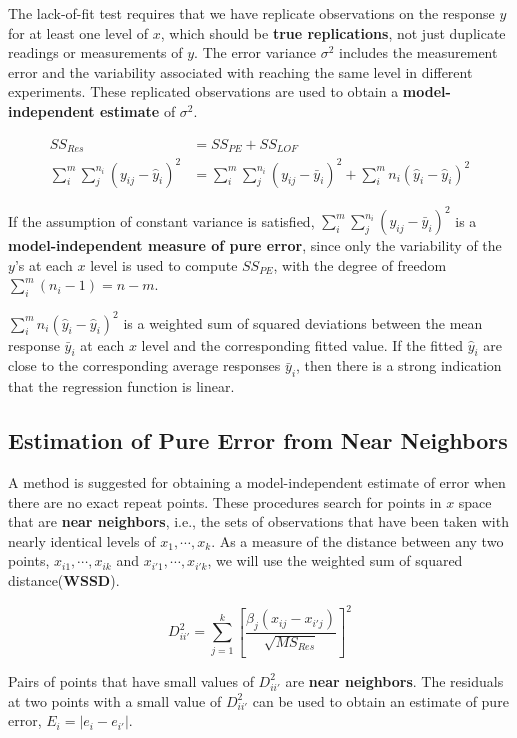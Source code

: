 \documentclass[12pt]{article}
\begin{document}
The lack-of-fit test requires that we have replicate observations on the response $y$ for at least one level of $x$, which should be \textbf{true replications}, not just duplicate readings or measurements of $y$. The error variance $\sigma^2$ includes the measurement error and the variability associated with reaching the same level in different experiments. These replicated observations are used to obtain a \textbf{model-independent estimate} of $\sigma^2$. 

$$
\begin{aligned}
SS_{Res} &= SS_{PE} + SS_{LOF} \\[8pt]
\sum_i^m \sum_j^{n_i} (y_{ij} - \hat{y}_i)^2 &= \sum_i^m \sum_j^{n_i} (y_{ij} - \bar{y}_i)^2 + \sum_i^m n_i (\hat{y}_i - \hat{y}_i)^2
\end{aligned}
$$

If the assumption of constant variance is satisfied, $\sum_i^m \sum_j^{n_i} (y_{ij} - \bar{y}_i)^2$ is a \textbf{model-independent measure of pure error}, since only the variability of the $y$'s at each $x$ level is used to compute $SS_{PE}$, with the degree of freedom $\sum_i^m (n_i - 1) = n - m$.

$\sum_i^m n_i (\hat{y}_i - \hat{y}_i)^2$ is a weighted sum of squared deviations between the mean response $\bar{y}_i$ at each $x$ level and the corresponding fitted value. If the fitted $\hat{y}_i$ are close to the corresponding average responses $\bar{y}_i$, then there is a strong indication that the regression function is linear.



\subsection{Estimation of Pure Error from Near Neighbors}

A method is suggested for obtaining a model-independent estimate of error when there are no exact repeat points. These procedures search for points in $x$ space that are \textbf{near neighbors}, i.e., the sets of observations that have been taken with nearly identical levels of $x_1, \cdots, x_k$. As a measure of the distance between any two points, $x_{i1}, \cdots, x_{ik}$ and $x_{i'1}, \cdots, x_{i'k}$, we will use the weighted sum of squared distance(\textbf{WSSD}). 

$$
D_{ii'}^2 = \sum_{j=1}^k \left[ \frac{ \hat{\beta}_j (x_{ij} - x_{i'j}) }{ \sqrt{MS_{Res}} } \right]^2
$$

Pairs of points that have small values of $D_{ii'}^2$ are \textbf{near neighbors}. The residuals at two points with a small value of $D_{ii'}^2$ can be used to obtain an estimate of pure error, $E_i = |e_i - e_{i'}|$. 
\end{document}
